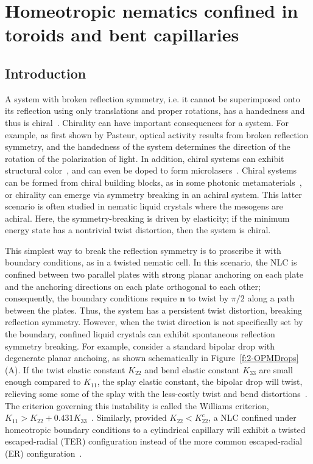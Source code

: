 \chapter{Homeotropic nematics confined in toroids and bent capillaries}

\section{Introduction}
A system with broken reflection symmetry, i.e. it cannot be superimposed onto its reflection using only translations and proper rotations, has a handedness and thus is chiral~\cite{RN175}.
Chirality can have important consequences for a system.
For example, as first shown by Pasteur, optical activity results from broken reflection symmetry, and the handedness of the system determines the direction of the rotation of the polarization of light\cite{RN291}.
In addition, chiral systems can exhibit structural color~\cite{RN308,RN307}, and can even be doped to form microlasers~\cite{RN305,RN306}.
Chiral systems can be formed from chiral building blocks, as in some photonic metamaterials~\cite{RN304}, or chirality can emerge via symmetry breaking in an achiral system\cite{RN294}.
This latter scenario is often studied in nematic liquid crystals where the mesogens are achiral\cite{RN297,RN296,RN298,RN295,RN299,RN193,RN46,RN192,RN191,RN293,RN302}.
Here, the symmetry-breaking is driven by elasticity; if the minimum energy state has a nontrivial twist distortion, then the system is chiral.

This simplest way to break the reflection symmetry is to proscribe it with boundary conditions, as in a twisted nematic cell.
In this scenario, the NLC is confined between two parallel plates with strong planar anchoring on each plate and the anchoring directions on each plate orthogonal to each other; consequently, the boundary conditions require $\mathbf{n}$ to twist by $\pi/2$ along a path between the plates.
Thus, the system has a persistent twist distortion, breaking reflection symmetry.
However, when the twist direction is not specifically set by the boundary, confined liquid crystals can exhibit spontaneous reflection symmetry breaking.
For example, consider a standard bipolar drop with degenerate planar anchoing, as shown schematically in Figure~\ref{f:2-OPMDrops}(A).
If the twist elastic constant $K_{22}$ and bend elastic constant $K_{33}$ are small enough compared to $K_{11}$, the splay elastic constant, the bipolar drop will twist, relieving some some of the splay with the less-costly twist and bend distortions~\cite{RN297,RN296,RN295}.
The criterion governing this instability is called the Williams criterion, $K_{11} > K_{22}+ 0.431 K_{33}$~\cite{RN297}.
Similarly, provided $K_{22}< K^c_{22}$, a NLC confined under homeotropic boundary conditions to a cylindrical capillary will exhibit a twisted escaped-radial (TER) configuration instead of the more common escaped-radial (ER) configuration~\cite{RN192}.

